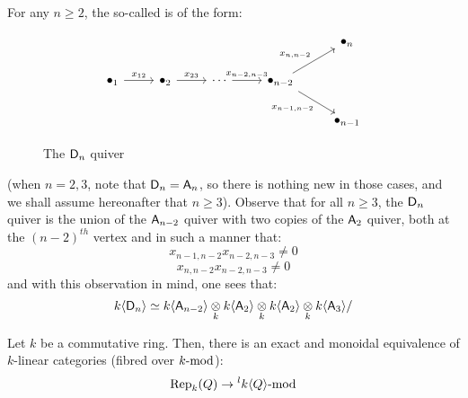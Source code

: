             \begin{example}
                For any $n \geq 2$, the so-called  is of the form:
                    \begin{figure}[H]
                        \centering
                            $$
                                \begin{tikzcd}
                                	&&&& {\bullet_n} \\
                                	{\bullet_1} & {\bullet_2} & \cdots & {\bullet_{n - 2}} \\
                                	&&&& {\bullet_{n - 1}}
                                	\arrow["{x_{12}}", from=2-1, to=2-2]
                                	\arrow["{x_{23}}", from=2-2, to=2-3]
                                	\arrow["{x_{n - 2, n - 3}}", from=2-3, to=2-4]
                                	\arrow["{x_{n, n - 2}}", from=2-4, to=1-5]
                                	\arrow["{x_{n - 1, n - 2}}"', from=2-4, to=3-5]
                                \end{tikzcd}
                            $$
                        \caption{The $\sfD_n$ quiver}
                        \label{fig: D_n_quiver}
                    \end{figure}
                (when $n = 2, 3$, note that $\sfD_n = \sfA_n$, so there is nothing new in those cases, and we shall assume hereonafter that $n \geq 3$). Observe that for all $n \geq 3$, the $\sfD_n$ quiver is the union of the $\sfA_{n - 2}$ quiver with two copies of the $\sfA_2$ quiver, both at the $(n - 2)^{th}$ vertex and in such a manner that:
                    $$x_{n - 1, n - 2} x_{n - 2, n - 3} \not = 0$$
                    $$x_{n, n - 2} x_{n - 2, n - 3} \not = 0$$
                and with this observation in mind, one sees that:
                    $$k\<\sfD_n\> \cong k\<\sfA_{n - 2}\> \tensor_k k\<\sfA_2\> \tensor_k k\<\sfA_2\> \tensor_k k\<\sfA_3\>/$$
            \end{example}
            \begin{example}
                
            \end{example}
            \begin{proposition} \label{prop: quiver_representations_are_modules_over_quiver_algebras}
                Let $k$ be a commutative ring. Then, there is an exact and monoidal equivalence of $k$-linear categories (fibred over $k\mod$):
                    $$\Rep_{k}(Q) \to {}^lk\<Q\>\mod$$
            \end{proposition}
